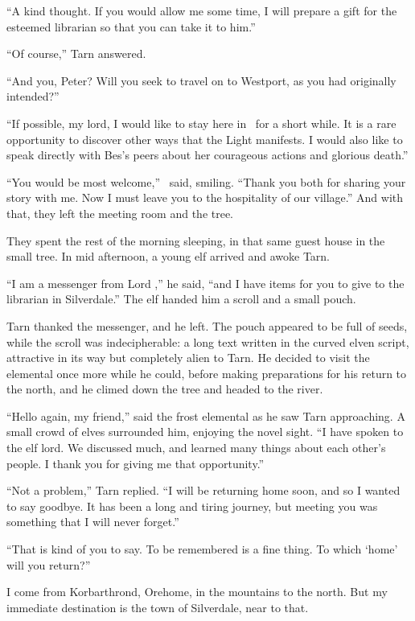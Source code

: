 ``A kind thought.  If you would allow me some time, I will prepare a gift for the esteemed librarian so that you can take it to him.''

``Of course,'' Tarn answered.

``And you, Peter?  Will you seek to travel on to Westport, as you had originally intended?''

``If possible, my lord, I would like to stay here in \inarthonor\ for a short while.  It is a rare opportunity to discover other ways that the Light manifests.  I would also like to speak directly with Bes's peers about her courageous actions and glorious death.''

``You would be most welcome,'' \arilor\ said, smiling.  ``Thank you both for sharing your story with me.  Now I must leave you to the hospitality of our village.''  And with that, they left the meeting room and the tree.

They spent the rest of the morning sleeping, in that same guest house in the small tree.  In mid afternoon, a young elf arrived and awoke Tarn.

``I am a messenger from Lord \arilor,'' he said, ``and I have items for you to give to the librarian in Silverdale.''  The elf handed him a scroll and a small pouch.

Tarn thanked the messenger, and he left.  The pouch appeared to be full of seeds, while the scroll was indecipherable: a long text written in the curved elven script, attractive in its way but completely alien to Tarn.  He decided to visit the elemental once more while he could, before making preparations for his return to the north, and he climed down the tree and headed to the river.

``Hello again, my friend,'' said the frost elemental as he saw Tarn approaching.  A small crowd of elves surrounded him, enjoying the novel sight.  ``I have spoken to the elf lord.  We discussed much, and learned many things about each other's people.  I thank you for giving me that opportunity.''

``Not a problem,'' Tarn replied.  ``I will be returning home soon, and so I wanted to say goodbye.  It has been a long and tiring journey, but meeting you was something that I will never forget.''

``That is kind of you to say.  To be remembered is a fine thing.  To which `home' will you return?''

I come from Korbarthrond, Orehome, in the mountains to the north.  But my immediate destination is the town of Silverdale, near to that.

